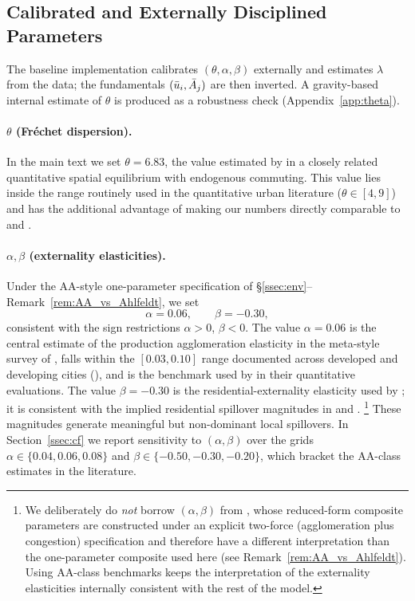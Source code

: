 \subsection{Calibrated and Externally Disciplined Parameters}\label{ssec:calib}

The baseline implementation calibrates $(\theta,\alpha,\beta)$
externally and estimates $\lambda$ from the data; the fundamentals
$(\bar u_i,\bar A_j)$ are then inverted.  A gravity-based internal
estimate of $\theta$ is produced as a robustness check
(Appendix~\ref{app:theta}).

\paragraph{$\theta$ (Fr\'echet dispersion).}
In the main text we set $\theta=6.83$, the value estimated by
\cite{Ahlfeldt2015} in a closely related quantitative spatial
equilibrium with endogenous commuting.  This value lies inside the
range routinely used in the quantitative urban literature
($\theta\in[4,9]$) and has the additional advantage of making our
numbers directly comparable to \cite{AllenArkolakis2022} and
\cite{Ahlfeldt2015}.

\paragraph{$\alpha,\beta$ (externality elasticities).}
Under the AA-style one-parameter specification of
\S\ref{ssec:env}--Remark~\ref{rem:AA_vs_Ahlfeldt}, we set
\begin{equation}
  \alpha=0.06,
  \qquad
  \beta=-0.30,
  \label{eq:alphabeta_bench}
\end{equation}
consistent with the sign restrictions $\alpha>0$, $\beta<0$.  The
value $\alpha=0.06$ is the central estimate of the production
agglomeration elasticity in the meta-style survey of
\cite{CombesGobillon2015}, falls within the $[0.03,0.10]$ range
documented across developed and developing cities
(\cite{CombesDurantonGobillon2008,CombesGobillon2015}), and is the
benchmark used by \cite{AllenArkolakis2014,AllenArkolakis2022} in
their quantitative evaluations.  The value $\beta=-0.30$ is the
residential-externality elasticity used by
\cite{AllenArkolakis2014}; it is consistent with the implied
residential spillover magnitudes in
\cite{MonteReddingRossiHansberg2018} and
\cite{HeblichReddingSturm2020}.%
\footnote{%
We deliberately do \emph{not} borrow $(\alpha,\beta)$ from
\cite{Ahlfeldt2015}, whose reduced-form composite parameters are
constructed under an explicit two-force (agglomeration plus
congestion) specification and therefore have a different
interpretation than the one-parameter composite used here (see
Remark~\ref{rem:AA_vs_Ahlfeldt}).  Using AA-class benchmarks keeps
the interpretation of the externality elasticities internally
consistent with the rest of the model.}
These magnitudes generate meaningful but non-dominant local
spillovers.  In Section~\ref{ssec:cf} we report sensitivity to
$(\alpha,\beta)$ over the grids $\alpha\in\{0.04,0.06,0.08\}$ and
$\beta\in\{-0.50,-0.30,-0.20\}$, which bracket the AA-class estimates
in the literature.

